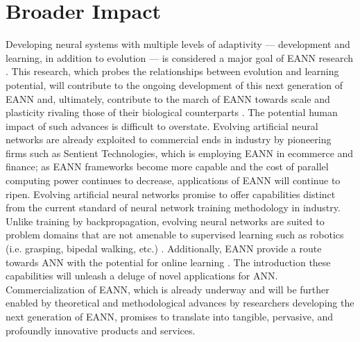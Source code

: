 \section{Broader Impact}

Developing neural systems with multiple levels of adaptivity --- development and learning, in addition to evolution --- is considered a major goal of EANN research \cite{Downing2015IntelligenceSystems}. This research, which probes the relationships between evolution and learning potential, will contribute to the ongoing development of this next generation of EANN and, ultimately, contribute to the march of EANN towards scale and plasticity rivaling those of their biological counterparts \cite{Clune2011OnRegularity,Tonelli2013OnNetworks}. The potential human impact of such advances is difficult to overstate. Evolving artificial neural networks are already exploited to commercial ends  in industry by pioneering firms such as Sentient Technologies, which is employing EANN in ecommerce and finance; as EANN frameworks become more capable and the cost of parallel computing power continues to decrease, applications of EANN will continue to ripen. Evolving artificial neural networks promise to offer capabilities distinct from the current standard of neural network training methodology in industry. Unlike training by backpropagation, evolving neural networks are suited to problem domains that are not amenable to supervised learning such as robotics (i.e. grasping, bipedal walking, etc.) \cite{Downing2015IntelligenceSystems}. Additionally, EANN provide a route towards ANN with the potential for online learning \cite{Tonelli2013OnNetworks}. The introduction these capabilities will unleash a deluge of novel applications for ANN. Commercialization of EANN, which is already underway and will be further enabled by theoretical and methodological advances by researchers developing the next generation of EANN, promises to translate into tangible, pervasive, and profoundly innovative products and services.




